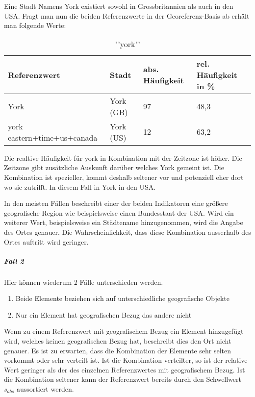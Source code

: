 						Eine Stadt Namens York existiert sowohl in Grossbritannien als auch in den USA.
						Fragt man nun die beiden Referenzwerte in der Georeferenz-Basis ab erhält man folgende Werte:

							\begin{table}[h]
								\centering
									\caption{"'york"'}
									\label{tab:york}
									\begin{tabular}{|l|l|l|l|}
									\hline
									Referenzwert 				& Stadt  	& abs. Häufigkeit & rel. Häufigkeit in \% \\ \hline \hline
									York          				& York (GB) & 97              & 48,3       \\ \hline
									york eastern+time+us+canada & York (US) & 12              & 63,2        \\ \hline
									\end{tabular}
							\end{table}

							Die realtive Häufigkeit für york in Kombination mit der Zeitzone ist höher. 
							Die Zeitzone gibt zusätzliche Auskunft darüber welches York gemeint ist. 
							Die Kombination ist spezieller, kommt deshalb seltener vor und potenziell eher dort wo sie zutrifft. 
							In diesem Fall in York in den USA. 

							In den meisten Fällen beschreibt einer der beiden Indikatoren eine größere geografische Region wie beispielsweise einen Bundesstaat der USA.
							Wird ein weiterer Wert, beispielsweise ein Städtename hinzugenommen, wird die Angabe des Ortes genauer. 
							Die Wahrscheinlichkeit, dass diese Kombination ausserhalb des Ortes auftritt wird geringer. 

					\subparagraph{Fall 2}

						Hier können wiederum 2 Fälle unterschieden werden.

						\begin{enumerate}
							\item Beide Elemente beziehen sich auf unterschiedliche geografische Objekte
							\item Nur ein Element hat geografischen Bezug das andere nicht 
						\end{enumerate}

						Wenn zu einem Referenzwert mit geografischem Bezug ein Element hinzugefügt wird, welches keinen geografischen Bezug hat, beschreibt dies den Ort nicht genauer.
						Es ist zu erwarten, dass die Kombination der Elemente sehr selten vorkommt oder sehr verteilt ist. 
						Ist die Kombination verteilter, so ist der relative Wert geringer als der des einzelnen Referenzwertes mit geografischem Bezug.
						Ist die Kombination seltener kann der Referenzwert bereits durch den Schwellwert $s_{abs}$ aussortiert werden.		

